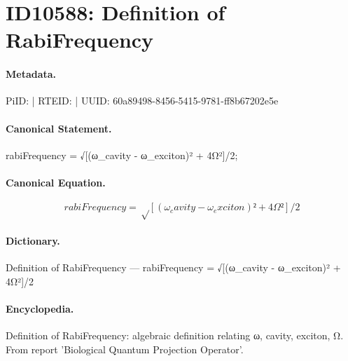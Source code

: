 \section*{ID10588: Definition of RabiFrequency}
\paragraph{Metadata.}
PiID:  | RTEID:  | UUID: 60a89498-8456-5415-9781-ff8b67202e5e

\paragraph{Canonical Statement.}
rabiFrequency = √[(ω\_cavity - ω\_exciton)² + 4Ω²]/2;

\paragraph{Canonical Equation.}
\[
rabiFrequency = √[(ω_cavity - ω_exciton)² + 4Ω²]/2
\]

\paragraph{Dictionary.}
Definition of RabiFrequency — rabiFrequency = √[(ω\_cavity - ω\_exciton)² + 4Ω²]/2

\paragraph{Encyclopedia.}
Definition of RabiFrequency: algebraic definition relating ω, cavity, exciton, Ω. From report 'Biological Quantum Projection Operator'.
